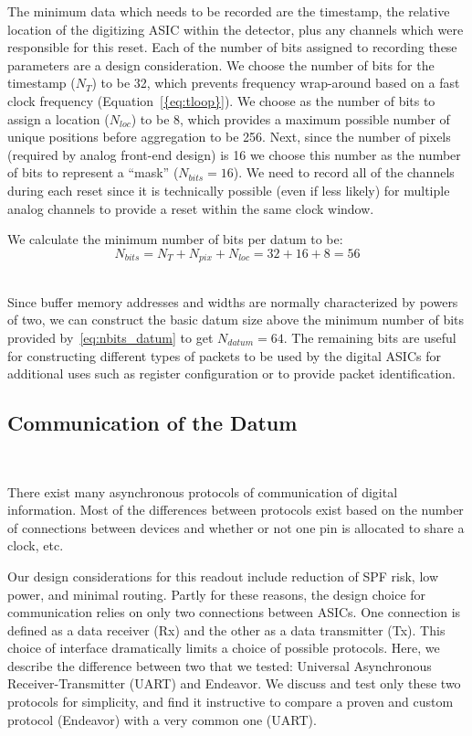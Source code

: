 The minimum data which needs to be recorded are the timestamp, the relative location of the digitizing ASIC within the detector, plus any channels which were responsible for this reset.
Each of the number of bits assigned to recording these parameters are a design consideration.
We choose the number of bits for the timestamp ($N_{T}$) to be 32, which prevents frequency wrap-around based on a fast clock frequency (Equation~\ref{{eq:tloop}}).
We choose as the number of bits to assign a location ($N_{loc}$) to be 8, which provides a maximum possible number of unique positions before aggregation to be 256.
Next, since the number of pixels (required by analog front-end design) is 16 we choose this number as the number of bits to represent a ``mask'' ($N_{bits} = 16$).
We need to record all of the channels during each reset since it is technically possible (even if less likely) for multiple analog channels to provide a reset within the same clock window.

We calculate the minimum number of bits per datum to be:
\begin{equation}
  N_{bits} = N_{T} + N_{pix} + N_{loc} = 32 + 16 + 8 = 56
\end{equation}~\label{eq:nbits_datum}

Since buffer memory addresses and widths are normally characterized by powers of two, we can construct the basic datum size above the minimum number of bits provided by~\ref{eq:nbits_datum} to get $N_{datum} = 64$.
The remaining bits are useful for constructing different types of packets to be used by the digital ASICs for additional uses such as register configuration or to provide packet identification.

\subsection{Communication of the Datum}~\label{sec:comms}

There exist many asynchronous protocols of communication of digital information.
Most of the differences between protocols exist based on the number of connections between devices and whether or not one pin is allocated to share a clock, etc.

Our design considerations for this readout include reduction of SPF risk, low power, and minimal routing.
Partly for these reasons, the design choice for communication relies on only two connections between ASICs.
One connection is defined as a data receiver (Rx) and the other as a data transmitter (Tx).
This choice of interface dramatically limits a choice of possible protocols.
Here, we describe the difference between two that we tested: Universal Asynchronous Receiver-Transmitter (UART) and Endeavor.
We discuss and test only these two protocols for simplicity, and find it instructive to compare a proven and custom protocol (Endeavor) with a very common one (UART).

